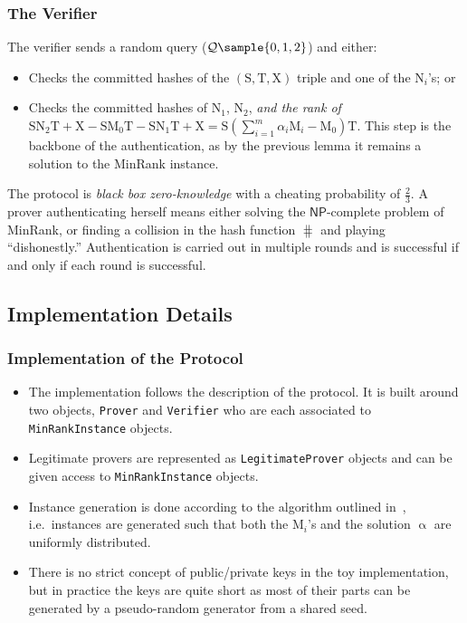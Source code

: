 \documentclass[serif, hyperref={unicode, breaklinks}, xcolor={x11names, psnames,
  dvipsnames, table}, usepdftitle=false]{beamer}
\newcommand{\NP}{\ensuremath{\mathsf{NP}}}
\renewcommand*{\vec}[1]{\bm{\mathrm{#1}}}
\newcommand{\matr}[1]{\bm{\mathrm{#1}}}
\begin{document}
\begin{frame}
  \frametitle{The Verifier}
  The verifier sends a random query ($\mathcal{Q} \sample \{0,1,2\}$) and
  either:
  \begin{itemize}
  \item Checks the committed hashes of the $(\matr{S}, \matr{T}, \matr{X})$
    triple and one of the $\matr{N}_i$'s; or
  \item Checks the committed hashes of $\matr{N}_1$, $\matr{N}_2$, \emph{and the
      rank of}
    $\matr{S}\matr{N}_2\matr{T} + \matr{X} - \matr{S}\matr{M}_0\matr{T} -
    \matr{S}\matr{N}_1\matr{T} + \matr{X} =
    \matr{S}\left(\sum\nolimits_{i=1}^{m} \alpha_i \matr{M}_i -
      \matr{M_0}\right) \matr{T}$.  This step is the backbone of the
    authentication, as by the previous lemma it remains a solution to the
    MinRank instance.
  \end{itemize}
  The protocol is \emph{black box zero-knowledge} with a cheating probability of
  $\frac 2 3$.  A prover authenticating herself means either
  \textcolor{RubineRed}{solving the \NP-complete problem of MinRank}, or
  \textcolor{RubineRed}{finding a collision in the hash function $\hash$} and
  playing ``dishonestly.''  Authentication is carried out in multiple rounds and
  is successful if and only if each round is successful.
\end{frame}
\subsection{Implementation Details}
\begin{frame}
  \frametitle{Implementation of the Protocol}
  \begin{itemize}
  \item The implementation follows the description of the protocol.  It is built
    around two objects, \texttt{Prover} and \texttt{Verifier} who are each
    associated to \texttt{MinRankInstance} objects.
  \item Legitimate provers are represented as \texttt{LegitimateProver} objects
    and can be given access to \texttt{MinRankInstance} objects.
  \item Instance generation is done according to the algorithm outlined
    in~\autocite{Cou01}, i.e.\ instances are generated such that both the
    $\matr{M}_i$'s and the solution $\vec\upalpha$ are uniformly distributed.
  \item There is no strict concept of public/private keys in the toy
    implementation, but in practice the keys are quite short as most of their
    parts can be generated by a pseudo-random generator from a shared seed.
  \end{itemize}
\end{frame}
\end{document}
